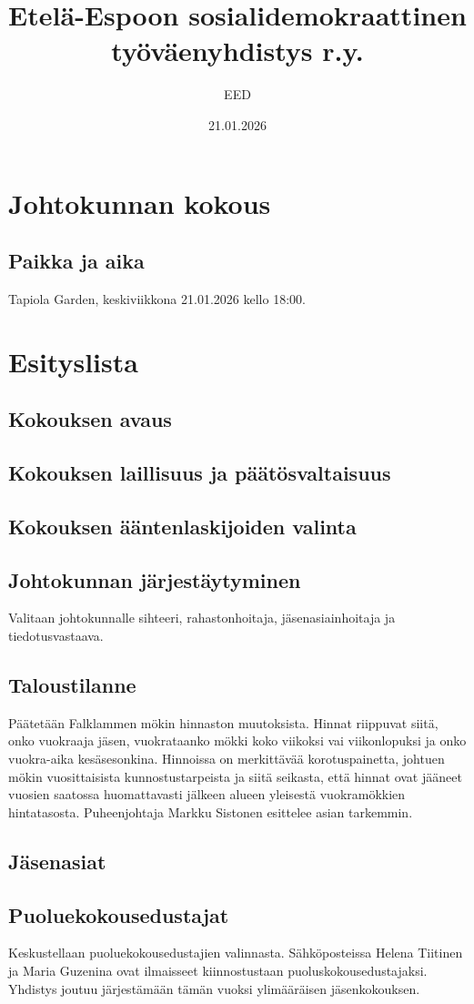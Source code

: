 \documentclass[a4paper,12pt]{article}
\title{Etelä-Espoon sosialidemokraattinen työväenyhdistys r.y.}
\author{EED}
\date{21.01.2026}
\begin{document}
\maketitle
\tableofcontents
\section*{Johtokunnan kokous}
\subsection*{Paikka ja aika}
Tapiola Garden, keskiviikkona 21.01.2026 kello 18:00.
\section*{Esityslista}
\subsection{Kokouksen avaus}
\subsection{Kokouksen laillisuus ja päätösvaltaisuus}
\subsection{Kokouksen ääntenlaskijoiden valinta}
\subsection{Johtokunnan järjestäytyminen}
Valitaan johtokunnalle sihteeri, rahastonhoitaja, jäsenasiainhoitaja ja tiedotusvastaava.
\subsection{Taloustilanne}
Päätetään Falklammen mökin hinnaston muutoksista. Hinnat riippuvat siitä, onko vuokraaja jäsen, vuokrataanko mökki koko viikoksi vai viikonlopuksi ja onko vuokra-aika kesäsesonkina. Hinnoissa on merkittävää korotuspainetta, johtuen mökin vuosittaisista kunnostustarpeista ja siitä seikasta, että hinnat ovat jääneet vuosien saatossa huomattavasti jälkeen alueen yleisestä vuokramökkien hintatasosta. Puheenjohtaja Markku Sistonen esittelee asian tarkemmin.
\subsection{Jäsenasiat}
\subsection{Puoluekokousedustajat}
Keskustellaan puoluekokousedustajien valinnasta. Sähköposteissa Helena Tiitinen ja Maria Guzenina ovat ilmaisseet kiinnostustaan puoluskokousedustajaksi. Yhdistys joutuu järjestämään tämän vuoksi ylimääräisen jäsenkokouksen.
\end{document}
